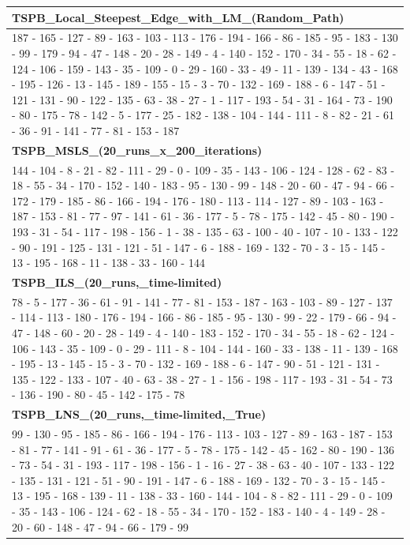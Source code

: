 \begin{table}[h!]
\begin{tabular}{|p{14cm}|}
\textbf{TSPB\_Local\_Steepest\_Edge\_with\_LM\_(Random\_Path)} \\ \hline
187 - 165 - 127 - 89 - 163 - 103 - 113 - 176 - 194 - 166 - 86 - 185 - 95 - 183 - 130 - 99 - 179 - 94 - 47 - 148 - 20 - 28 - 149 - 4 - 140 - 152 - 170 - 34 - 55 - 18 - 62 - 124 - 106 - 159 - 143 - 35 - 109 - 0 - 29 - 160 - 33 - 49 - 11 - 139 - 134 - 43 - 168 - 195 - 126 - 13 - 145 - 189 - 155 - 15 - 3 - 70 - 132 - 169 - 188 - 6 - 147 - 51 - 121 - 131 - 90 - 122 - 135 - 63 - 38 - 27 - 1 - 117 - 193 - 54 - 31 - 164 - 73 - 190 - 80 - 175 - 78 - 142 - 5 - 177 - 25 - 182 - 138 - 104 - 144 - 111 - 8 - 82 - 21 - 61 - 36 - 91 - 141 - 77 - 81 - 153 - 187 \\ \hline
\textbf{TSPB\_MSLS\_(20\_runs\_x\_200\_iterations)} \\ \hline
144 - 104 - 8 - 21 - 82 - 111 - 29 - 0 - 109 - 35 - 143 - 106 - 124 - 128 - 62 - 83 - 18 - 55 - 34 - 170 - 152 - 140 - 183 - 95 - 130 - 99 - 148 - 20 - 60 - 47 - 94 - 66 - 172 - 179 - 185 - 86 - 166 - 194 - 176 - 180 - 113 - 114 - 127 - 89 - 103 - 163 - 187 - 153 - 81 - 77 - 97 - 141 - 61 - 36 - 177 - 5 - 78 - 175 - 142 - 45 - 80 - 190 - 193 - 31 - 54 - 117 - 198 - 156 - 1 - 38 - 135 - 63 - 100 - 40 - 107 - 10 - 133 - 122 - 90 - 191 - 125 - 131 - 121 - 51 - 147 - 6 - 188 - 169 - 132 - 70 - 3 - 15 - 145 - 13 - 195 - 168 - 11 - 138 - 33 - 160 - 144 \\ \hline
\textbf{TSPB\_ILS\_(20\_runs,\_time-limited)} \\ \hline
78 - 5 - 177 - 36 - 61 - 91 - 141 - 77 - 81 - 153 - 187 - 163 - 103 - 89 - 127 - 137 - 114 - 113 - 180 - 176 - 194 - 166 - 86 - 185 - 95 - 130 - 99 - 22 - 179 - 66 - 94 - 47 - 148 - 60 - 20 - 28 - 149 - 4 - 140 - 183 - 152 - 170 - 34 - 55 - 18 - 62 - 124 - 106 - 143 - 35 - 109 - 0 - 29 - 111 - 8 - 104 - 144 - 160 - 33 - 138 - 11 - 139 - 168 - 195 - 13 - 145 - 15 - 3 - 70 - 132 - 169 - 188 - 6 - 147 - 90 - 51 - 121 - 131 - 135 - 122 - 133 - 107 - 40 - 63 - 38 - 27 - 1 - 156 - 198 - 117 - 193 - 31 - 54 - 73 - 136 - 190 - 80 - 45 - 142 - 175 - 78 \\ \hline
\textbf{TSPB\_LNS\_(20\_runs,\_time-limited,\_True)} \\ \hline
99 - 130 - 95 - 185 - 86 - 166 - 194 - 176 - 113 - 103 - 127 - 89 - 163 - 187 - 153 - 81 - 77 - 141 - 91 - 61 - 36 - 177 - 5 - 78 - 175 - 142 - 45 - 162 - 80 - 190 - 136 - 73 - 54 - 31 - 193 - 117 - 198 - 156 - 1 - 16 - 27 - 38 - 63 - 40 - 107 - 133 - 122 - 135 - 131 - 121 - 51 - 90 - 191 - 147 - 6 - 188 - 169 - 132 - 70 - 3 - 15 - 145 - 13 - 195 - 168 - 139 - 11 - 138 - 33 - 160 - 144 - 104 - 8 - 82 - 111 - 29 - 0 - 109 - 35 - 143 - 106 - 124 - 62 - 18 - 55 - 34 - 170 - 152 - 183 - 140 - 4 - 149 - 28 - 20 - 60 - 148 - 47 - 94 - 66 - 179 - 99 \\ \hline

\end{tabular}
\end{table}
